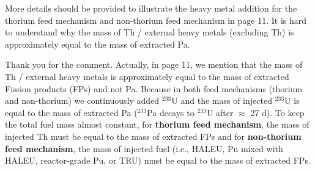 \documentclass[answers,11pt]{exam}
\begin{document}
\begin{questions}
\begin{solution}
        \end{solution}

        

        \question More details should be provided to illustrate the heavy metal addition for the thorium feed mechanism and non-thorium feed mechanism in page 11. It is hard to understand why the mass of Th / external heavy metals (excluding Th) is approximately equal to the mass of extracted Pa.
        \begin{solution}
               Thank you for the comment. Actually, in page 11, we mention that the mass of Th / external heavy metals is approximately equal to the mass of extracted Fission products (FPs) and not Pa. Because in both feed mechanisms (thorium and non-thorium) we continuously added $^{233}$U and the mass of injected $^{233}$U is equal to the mass of extracted Pa ($^{233}$Pa decays to $^{233}$U after $\approx$ 27 d). To keep the total fuel mass almost constant, for \textbf{thorium feed mechanism}, the mass of injected Th must be equal to the mass of extracted FPs and for \textbf{non-thorium feed mechanism}, the mass of injected fuel (i.e., HALEU, Pu mixed with HALEU, reactor-grade Pu, or TRU) must be equal to the mass of extracted FPs.
              

\end{solution}
\end{questions}
\end{document}
